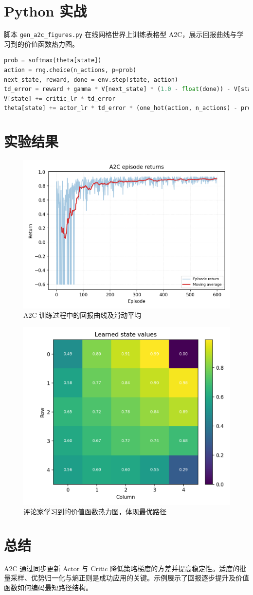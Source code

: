 \documentclass[UTF8,zihao=-4]{ctexart}
\begin{document}
\section{Python 实战}
脚本 \texttt{gen\_a2c\_figures.py} 在线网格世界上训练表格型 A2C，展示回报曲线与学习到的价值函数热力图。
\begin{lstlisting}[language=Python,caption={脚本 gen_a2c_figures.py 片段}]
prob = softmax(theta[state])
action = rng.choice(n_actions, p=prob)
next_state, reward, done = env.step(state, action)
td_error = reward + gamma * V[next_state] * (1.0 - float(done)) - V[state]
V[state] += critic_lr * td_error
theta[state] += actor_lr * td_error * (one_hot(action, n_actions) - prob)
\end{lstlisting}

\section{实验结果}
\begin{figure}[H]
  \centering
  \includegraphics[width=0.8\linewidth]{a2c_returns.png}
  \caption{A2C 训练过程中的回报曲线及滑动平均}
  \label{fig:a2c_returns_cn}
\end{figure}

\begin{figure}[H]
  \centering
  \includegraphics[width=0.82\linewidth]{a2c_value_baseline.png}
  \caption{评论家学习到的价值函数热力图，体现最优路径}
  \label{fig:a2c_value_baseline_cn}
\end{figure}

\FloatBarrier
\section{总结}
A2C 通过同步更新 Actor 与 Critic 降低策略梯度的方差并提高稳定性。适度的批量采样、优势归一化与熵正则是成功应用的关键。示例展示了回报逐步提升及价值函数如何编码最短路径结构。
\end{document}
